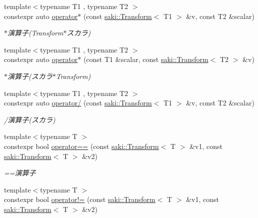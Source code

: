 \begin{DoxyCompactItemize}
{\footnotesize template$<$typename T1 , typename T2 $>$ }\\constexpr auto \mbox{\hyperlink{namespacesaki_a4ccd8e3dbc886bb65d452308a8de0409}{operator$\ast$}} (const \mbox{\hyperlink{classsaki_1_1_transform}{saki\+::\+Transform}}$<$ T1 $>$ \&v, const T2 \&scalar)
\begin{DoxyCompactList}\small\item\em $\ast$演算子(Transform$\ast$スカラ) \end{DoxyCompactList}\item 
{\footnotesize template$<$typename T1 , typename T2 $>$ }\\constexpr auto \mbox{\hyperlink{namespacesaki_a58e8c0c0b829ce6f2da4895bef1f0512}{operator$\ast$}} (const T1 \&scalar, const \mbox{\hyperlink{classsaki_1_1_transform}{saki\+::\+Transform}}$<$ T2 $>$ \&v)
\begin{DoxyCompactList}\small\item\em $\ast$演算子(スカラ$\ast$\+Transform) \end{DoxyCompactList}\item 
{\footnotesize template$<$typename T1 , typename T2 $>$ }\\constexpr auto \mbox{\hyperlink{namespacesaki_a317c4128723315d14a81d7643fa080aa}{operator/}} (const \mbox{\hyperlink{classsaki_1_1_transform}{saki\+::\+Transform}}$<$ T1 $>$ \&v, const T2 \&scalar)
\begin{DoxyCompactList}\small\item\em /演算子(スカラ) \end{DoxyCompactList}\item 
{\footnotesize template$<$typename T $>$ }\\constexpr bool \mbox{\hyperlink{namespacesaki_ac56eb811c4d74d9b697f061b08d9f0c6}{operator==}} (const \mbox{\hyperlink{classsaki_1_1_transform}{saki\+::\+Transform}}$<$ T $>$ \&v1, const \mbox{\hyperlink{classsaki_1_1_transform}{saki\+::\+Transform}}$<$ T $>$ \&v2)
\begin{DoxyCompactList}\small\item\em ==演算子 \end{DoxyCompactList}\item 
{\footnotesize template$<$typename T $>$ }\\constexpr bool \mbox{\hyperlink{namespacesaki_aeb1efde4ebc127c358fe17c9725fc622}{operator!=}} (const \mbox{\hyperlink{classsaki_1_1_transform}{saki\+::\+Transform}}$<$ T $>$ \&v1, const \mbox{\hyperlink{classsaki_1_1_transform}{saki\+::\+Transform}}$<$ T $>$ \&v2)

\end{DoxyCompactItemize}
